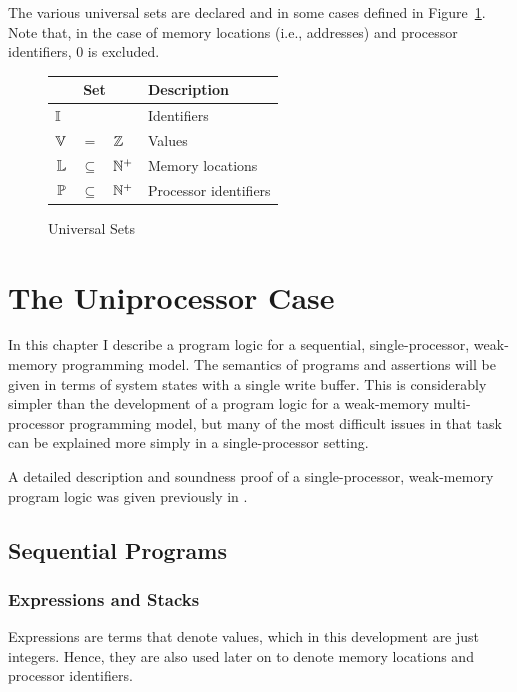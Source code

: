 \documentclass[11pt]{report}
\begin{document}
The various universal sets are declared and in some cases defined in Figure~\ref{fig:universes}. Note that, in the case of memory locations (i.e., addresses) and processor identifiers, 0 is excluded. 

\begin{figure}[ht]
	\centering
	\begin{tabular}{rcl|l}
		\multicolumn{3}{c}{Set} & Description \\ \hline
		\multicolumn{3}{l|}{$\mathbb{I}$} & Identifiers \\
		$\mathbb{V}$ & $=$ &  $\mathbb{Z}$ & Values \\
		$\mathbb{L}$ & $\subseteq$  &  $\mathbb{N}^+$ & Memory locations \\
		$\mathbb{P}$ &$\subseteq$ &  $\mathbb{N}^+$ & Processor identifiers
	\end{tabular}
	\caption{\label{fig:universes}Universal Sets}
\end{figure}


\chapter{The Uniprocessor Case}
\label{ch:uniprocessor}

In this chapter I describe a program logic for a sequential, single-processor, weak-memory programming model. The semantics of programs and assertions will be given in terms of system states with a single write buffer. This is considerably simpler than the development of a program logic for a weak-memory multi-processor programming model, but many of the most difficult issues in that task can be explained more simply in a single-processor setting. 

A detailed description and soundness proof of a single-processor, weak-memory program logic was given previously in \cite{wmsldetails}. 

\section{Sequential Programs}
\label{sec:sequential-programs}

\subsection{Expressions and Stacks}
\label{sec:expressions}

Expressions are terms that denote values, which in this development are just integers. Hence, they are also used later on to denote memory locations and processor identifiers. 
\end{document}
